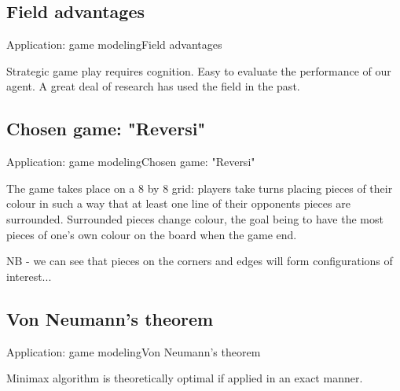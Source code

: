 \subsection{Field advantages}
\begin{frame}{Application: game modeling}{Field advantages}

Strategic game play requires cognition. Easy to evaluate the performance of our 
agent. A great deal of research has used  the field in the past.

\end{frame}

\subsection{Chosen game: "Reversi"}
\begin{frame}{Application: game modeling}{Chosen game: "Reversi"}

The game takes place on a 8 by 8 grid: players take turns placing pieces of 
their colour in such a way that at least one line of their opponents pieces are
surrounded. Surrounded pieces change colour, the goal being to have the most 
pieces of one's own colour on the board when the game end.

NB - we can see that pieces on the corners and edges will form configurations of 
interest...

\end{frame}

\subsection{Von Neumann's theorem}
\begin{frame}{Application: game modeling}{Von Neumann's theorem}

Minimax algorithm is theoretically optimal if applied in an exact manner.

\end{frame}


